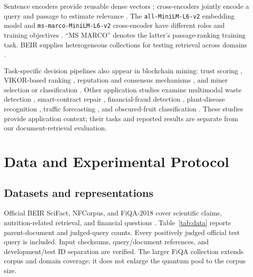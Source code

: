 \documentclass[conference]{IEEEtran}
\newcommand{\resultinput}[1]{}
\begin{document}
Sentence encoders provide reusable dense vectors \cite{reimers2019sentencebert}; cross-encoders jointly encode a query and passage to estimate relevance \cite{nogueira2019bert}. The \texttt{all-MiniLM-L6-v2} embedding model and \texttt{ms-marco-MiniLM-L6-v2} cross-encoder have different roles and training objectives \cite{wang2020minilm,minilm_model,crossencoder_models}. ``MS MARCO'' denotes the latter's passage-ranking training task. BEIR supplies heterogeneous collections for testing retrieval across domains \cite{thakur2021beir}.

Task-specific decision pipelines also appear in blockchain mining: trust scoring \cite{puppala2023trust,puppala2023cluster}, VIKOR-based ranking \cite{puppala2024vikor}, reputation and consensus mechanisms \cite{puppala2024reputation,puppala2025consensus}, and miner selection or classification \cite{puppala2024smnst,puppala2024svm}. Other application studies examine multimodal waste detection \cite{puppala2025marine}, smart-contract repair \cite{sravanthi2026incident}, financial-fraud detection \cite{sravanthi2025fraud}, plant-disease recognition \cite{sravanthi2025plant}, traffic forecasting \cite{sravanthi2025traffic}, and obscured-fruit classification \cite{sravanthi2026harvest}. These studies provide application context; their tasks and reported results are separate from our document-retrieval evaluation.

\section{Data and Experimental Protocol}\label{sec:protocol}
\subsection{Datasets and representations}
Official BEIR SciFact, NFCorpus, and FiQA-2018 cover scientific claims, nutrition-related retrieval, and financial questions \cite{wadden2020scifact,boteva2016nfcorpus,maia2018fiqa}. Table~\ref{tab:data} reports parent-document and judged-query counts. Every positively judged official test query is included. Input checksums, query/document references, and development/test ID separation are verified. The larger FiQA collection extends corpus and domain coverage; it does not enlarge the quantum pool to the corpus size.

\begin{table}[t]
\centering\small\setlength{\tabcolsep}{3pt}
\caption{Dataset counts and frozen base lexical/diversity weights.}
\label{tab:data}
\resultinput{datasets.tex}
\end{table}
\end{document}

